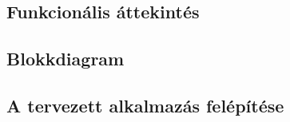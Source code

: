 \chapter{\attekintes}

\section{Funkcionális áttekintés}

\section{Blokkdiagram}

\section{A tervezett alkalmazás felépítése}